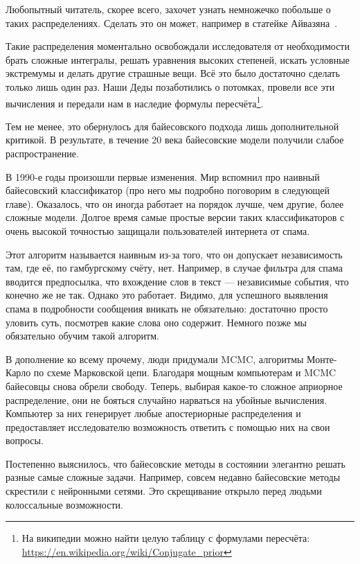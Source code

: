 \documentclass[12pt, a4paper, oneside]{extreport}
\theoremstyle{plain}              %
\theoremstyle{definition}         %
\begin{document}
Любопытный читатель, скорее всего, захочет узнать немножечко побольше о таких распределениях. Сделать это он может, например в статейке Айвазяна~\cite{aivaz2008}. 

Такие распределения моментально освобождали исследователя от необходимости брать сложные интегралы, решать уравнения высоких степеней, искать условные экстремумы и делать другие страшные вещи. Всё это было достаточно сделать только лишь один раз. Наши Деды позаботились о потомках, провели все эти вычисления и передали нам в наследие формулы пересчёта\footnote{На википедии можно найти целую таблицу с формулами пересчёта: \url{ https://en.wikipedia.org/wiki/Conjugate_prior}}.

Тем не менее, это обернулось для байесовского подхода лишь дополнительной критикой. В результате, в течение 20 века байесовские модели получили слабое распространение.  

В 1990-е годы произошли первые изменения. Мир вспомнил про наивный байесовский классификатор (про него мы подробно поговорим в следующей главе). Оказалось, что он иногда работает на порядок лучше, чем другие, более сложные модели. Долгое время самые простые версии таких классификаторов с очень высокой точностью защищали пользователей интернета от спама. 

Этот алгоритм называется наивным из-за того, что он допускает независимость там, где её, по гамбургскому счёту, нет. Например, в случае фильтра для спама вводится предпосылка, что вхождение слов в текст --- независимые события, что конечно же не так. Однако это работает. Видимо, для успешного выявления спама в подробности сообщения вникать не обязательно: достаточно просто уловить суть, посмотрев какие слова оно содержит. Немного позже мы обязательно обучим такой алгоритм.

В дополнение ко всему прочему, люди придумали MCMC, алгоритмы Монте-Карло по схеме Марковской цепи. Благодаря мощным компьютерам и MCMC байесовцы снова обрели свободу. Теперь, выбирая какое-то сложное априорное распределение, они не бояться случайно нарваться на убойные вычисления. Компьютер за них генерирует любые апостериорные распределения и предоставляет исследователю возможность ответить с помощью них на свои вопросы. 

Постепенно выяснилось, что байесовские методы в состоянии элегантно решать разные самые сложные задачи.  Например, совсем недавно байесовские методы скрестили с нейронными сетями. Это скрещивание открыло перед людьми колоссальные возможности. 
\end{document}
